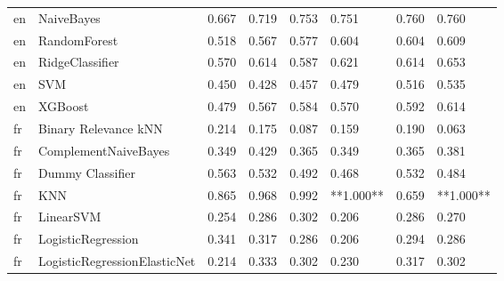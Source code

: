 \begin{tabular}{llllllll}
      en &                      NaiveBayes & 0.667 &                     0.719 &                 0.753 &                  0.751 &                                   0.760 &     0.760 \\
      en &                    RandomForest & 0.518 &                     0.567 &                 0.577 &                  0.604 &                                   0.604 &     0.609 \\
      en &                 RidgeClassifier & 0.570 &                     0.614 &                 0.587 &                  0.621 &                                   0.614 &     0.653 \\
      en &                             SVM & 0.450 &                     0.428 &                 0.457 &                  0.479 &                                   0.516 &     0.535 \\
      en &                         XGBoost & 0.479 &                     0.567 &                 0.584 &                  0.570 &                                   0.592 &     0.614 \\
      fr &            Binary Relevance kNN & 0.214 &                     0.175 &                 0.087 &                  0.159 &                                   0.190 &     0.063 \\
      fr &            ComplementNaiveBayes & 0.349 &                     0.429 &                 0.365 &                  0.349 &                                   0.365 &     0.381 \\
      fr &                Dummy Classifier & 0.563 &                     0.532 &                 0.492 &                  0.468 &                                   0.532 &     0.484 \\
      fr &                             KNN & 0.865 &                     0.968 &                 0.992 &              **1.000** &                                   0.659 & **1.000** \\
      fr &                       LinearSVM & 0.254 &                     0.286 &                 0.302 &                  0.206 &                                   0.286 &     0.270 \\
      fr &              LogisticRegression & 0.341 &                     0.317 &                 0.286 &                  0.206 &                                   0.294 &     0.286 \\
      fr &    LogisticRegressionElasticNet & 0.214 &                     0.333 &                 0.302 &                  0.230 &                                   0.317 &     0.302 \\

\end{tabular}
